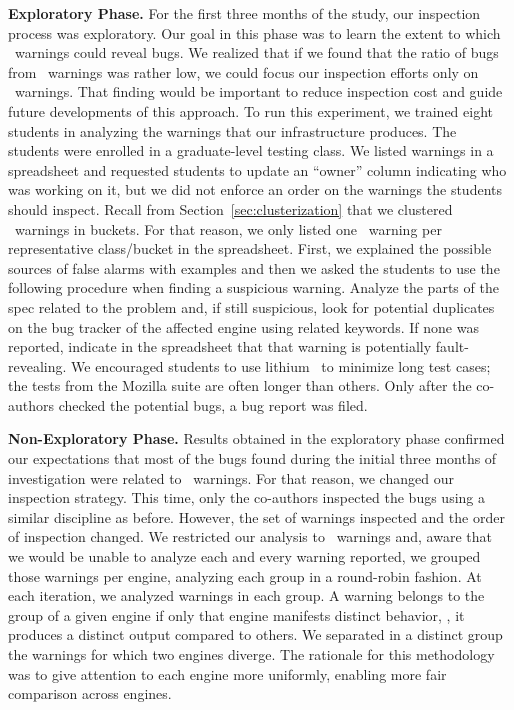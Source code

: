 \documentclass[10pt,conference,anonymous]{IEEEtran}
\begin{document}
\vspace{1ex}
\noindent\textbf{Exploratory Phase.} For the first three months of the
study, our inspection process was exploratory.  Our goal in this phase
was to learn the extent to which \lo\ warnings could reveal bugs. We
realized that if we found that the ratio of bugs from \lo\ warnings
was rather low, we could focus our inspection efforts only on
\hi\ warnings. That finding would be important to reduce inspection
cost and guide future developments of this approach. To run this
experiment, we trained eight students in analyzing the warnings that
our infrastructure produces. The students were enrolled in a
graduate-level testing class. We listed warnings in a spreadsheet and
requested students to update an ``owner'' column indicating who was
working on it, but we did not enforce an order on the warnings the
students should inspect. Recall from Section~\ref{sec:clusterization}
that we clustered \lo\ warnings in buckets. For that reason, we only
listed one \lo\ warning per representative class/bucket in the
spreadsheet. First, we explained the possible sources of false alarms
with examples and then we asked the students to use the following
procedure when finding a suspicious warning. Analyze the parts of the
spec related to the problem and, if still suspicious, look for
potential duplicates on the bug tracker of the affected engine using
related keywords. If none was reported, indicate in the spreadsheet
that that warning is potentially fault-revealing. We encouraged
students to use lithium~\cite{lithium} to minimize long test cases;
the tests from the Mozilla suite are often longer than others. Only
after the co-authors checked the potential bugs, a bug report was
filed.

\vspace{1ex}
\noindent\textbf{Non-Exploratory Phase.} Results obtained in the
exploratory phase confirmed our expectations that most of the bugs
found during the initial three months of investigation were related to
\hi\ warnings. For that reason, we changed our inspection
strategy. This time, only the co-authors inspected the bugs using a
similar discipline as before. However, the set of warnings inspected
and the order of inspection changed. We restricted our analysis to
\hi\ warnings and, aware that we would be unable to analyze each and
every warning reported, we grouped those warnings per engine,
analyzing each group in a round-robin fashion.  At each iteration, we
analyzed  warnings in each group. A warning belongs to the
group of a given engine if only that engine manifests distinct
behavior, \ie{}, it produces a distinct output compared to others. We
separated in a distinct group the warnings for which two engines
diverge. The rationale for this methodology was to give attention to
each engine more uniformly, enabling more fair comparison across
engines.
\end{document}
